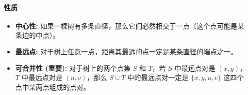 \begin{spacing}{0.95}
	\paragraph{性质}
	\begin{itemize}
		\item \textbf{中心性:} 如果一棵树有多条直径，那么它们必然相交于一点（这个点可能是某条边的中点）。
		\item \textbf{最远点:} 对于树上任意一点，距离其最远的点一定是某条直径的端点之一。
		\item \textbf{可合并性 (重要):} 对于树上的两个点集 $S$ 和 $T$，若 $S$ 中最远点对是 $(x,y)$，$T$ 中最远点对是 $(u,v)$，那么 $S \cup T$ 中的最远点对一定是 $\{x, y, u, v\}$ 这四个点中某两点组成的点对。
	\end{itemize}
	
\end{spacing}

